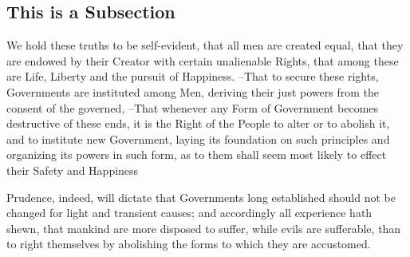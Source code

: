 \subsection{This is a Subsection}

We hold these truths to be self-evident, that all men are created equal,  that they are endowed by their Creator with certain unalienable Rights,  that among these are Life, Liberty and the pursuit of Happiness. --That to secure these  rights, Governments are instituted among Men, deriving their just powers  from the consent of the governed, --That whenever any Form of Government  becomes destructive of these ends, it is the Right of the People to alter  or to abolish it, and to institute new Government, laying its foundation on  such principles and organizing its powers in such form, as to them shall  seem most likely to effect their Safety and Happiness
\begin{figure}[htb]
	\centering
\end{figure}
Prudence, indeed, will dictate that Governments long established should not  be changed for light and transient causes; and accordingly all experience  hath shewn, that mankind are more disposed to suffer, while evils are  sufferable, than to right themselves by abolishing the forms to which they  are accustomed.\cite{BhattacharyaJames-1999-A-Theory-of-Thi-0,RimrottJanabi-Sharifi-1992-A-Torque-Free-F-0,DaviesMoon-1993-3-D-Spatial-Cha-0,Tonkin-1980-A-Basic-Attitud-0,Matsumoto-1984-A-Chaotic-Attra-0,MacKay-1988-A-Criterion-for-0,FreundNix-1996-A-Critical-Thic-0,MarsdenHolmes-1979-A-Horseshoe-in--0,Koiller-1984-A-Mechanical-Sy-0,TsiotrasLonguski-1995-A-New-Parameter-0,ShimadaNagashima-1979-A-Numerical-App-0,HsuLee-1971-A-Stability-Stu-0,Muller-PfeifferKranenburg-1992-A-Two-Dimension-0,HashinShtrikman-1963-A-Variational-A-0,Junkins-1997-Adventures-on-t-0}
